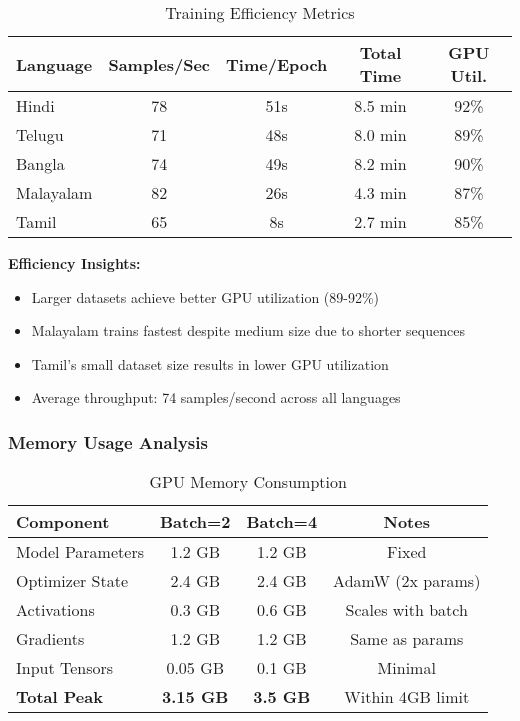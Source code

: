 \documentclass[12pt,a4paper]{article}
\begin{document}
\begin{table}[H]
\centering
\caption{Training Efficiency Metrics}
\small
\begin{tabular}{lcccc}
\toprule
\textbf{Language} & \textbf{Samples/Sec} & \textbf{Time/Epoch} & \textbf{Total Time} & \textbf{GPU Util.} \\
\midrule
Hindi & 78 & 51s & 8.5 min & 92\% \\
Telugu & 71 & 48s & 8.0 min & 89\% \\
Bangla & 74 & 49s & 8.2 min & 90\% \\
Malayalam & 82 & 26s & 4.3 min & 87\% \\
Tamil & 65 & 8s & 2.7 min & 85\% \\
\bottomrule
\end{tabular}
\end{table}

\textbf{Efficiency Insights:}
\begin{itemize}
    \item Larger datasets achieve better GPU utilization (89-92\%)
    \item Malayalam trains fastest despite medium size due to shorter sequences
    \item Tamil's small dataset size results in lower GPU utilization
    \item Average throughput: 74 samples/second across all languages
\end{itemize}

\subsubsection{Memory Usage Analysis}

\begin{table}[H]
\centering
\caption{GPU Memory Consumption}
\small
\begin{tabular}{lccc}
\toprule
\textbf{Component} & \textbf{Batch=2} & \textbf{Batch=4} & \textbf{Notes} \\
\midrule
Model Parameters & 1.2 GB & 1.2 GB & Fixed \\
Optimizer State & 2.4 GB & 2.4 GB & AdamW (2x params) \\
Activations & 0.3 GB & 0.6 GB & Scales with batch \\
Gradients & 1.2 GB & 1.2 GB & Same as params \\
Input Tensors & 0.05 GB & 0.1 GB & Minimal \\
\midrule
\textbf{Total Peak} & \textbf{3.15 GB} & \textbf{3.5 GB} & Within 4GB limit \\
\bottomrule
\end{tabular}
\end{table}
\end{document}
